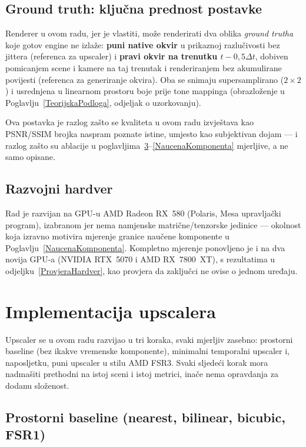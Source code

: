 \documentclass{mathos}
\begin{document}
\section{Ground truth: ključna prednost postavke}

Renderer u ovom radu, jer je vlastiti, može renderirati dva oblika
\emph{ground trutha} koje gotov engine ne izlaže: \textbf{puni native okvir}
u prikaznoj razlučivosti bez jittera (referenca za upscaler) i \textbf{pravi
okvir na trenutku $t-0,5\Delta t$}, dobiven pomicanjem scene i kamere na
taj trenutak i renderiranjem bez akumulirane povijesti (referenca za
generiranje okvira). Oba se snimaju supersamplirano ($2\times2$) i usrednjena
u linearnom prostoru boje prije tone mappinga (obrazloženje u
Poglavlju~\ref{TeorijskaPodloga}, odjeljak o uzorkovanju).

Ova postavka je razlog zašto se kvaliteta u ovom radu izvještava kao PSNR/SSIM
brojka naspram poznate istine, umjesto kao subjektivan dojam — i razlog zašto
su ablacije u poglavljima~\ref{ImplUpscaler}--\ref{NaucenaKomponenta}
mjerljive, a ne samo opisane.

\section{Razvojni hardver}

Rad je razvijan na GPU-u AMD Radeon RX~580 (Polaris, Mesa upravljački
program), izabranom jer nema namjenske matrične/tenzorske jedinice — okolnost
koja izravno motivira mjerenje granice naučene komponente u
Poglavlju~\ref{NaucenaKomponenta}. Kompletno mjerenje ponovljeno je i na
dva novija GPU-a (NVIDIA RTX~5070 i AMD RX~7800~XT), s rezultatima u
odjeljku~\ref{ProvjeraHardver}, kao provjera da zaključci ne ovise o jednom
uređaju.


\chapter{Implementacija upscalera}\label{ImplUpscaler}

Upscaler se u ovom radu razvijao u tri koraka, svaki mjerljiv zasebno: prostorni
baseline (bez ikakve vremenske komponente), minimalni temporalni upscaler i,
naposljetku, puni upscaler u stilu AMD FSR3. Svaki sljedeći korak mora
nadmašiti prethodni na istoj sceni i istoj metrici, inače nema opravdanja za
dodanu složenost.

\section{Prostorni baseline (nearest, bilinear, bicubic, FSR1)}
\end{document}
